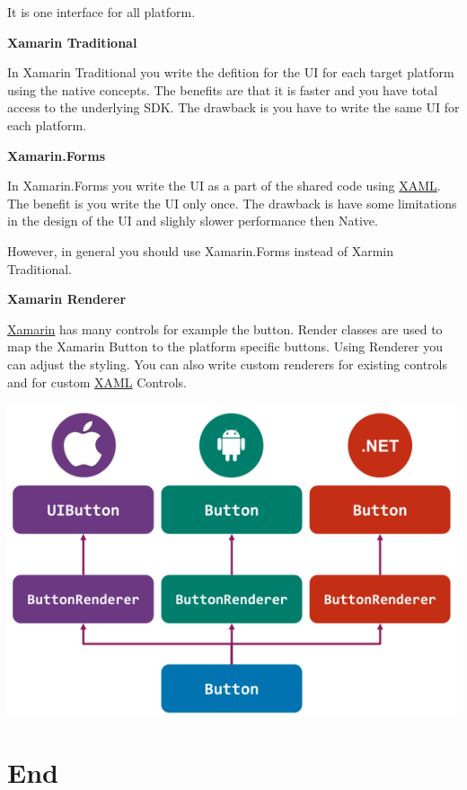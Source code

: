 \documentclass[10pt,twoside,landscape]{article}
\begin{document}
\begin{multicols}{3}
It is one interface for all platform.

\textbf{Xamarin Traditional}

In Xamarin Traditional you write the defition for the UI for each target platform using the native concepts.
The benefits are that it is faster and you have total access to the underlying SDK.
The drawback is you have to write the same UI for each platform.

\textbf{Xamarin.Forms}

In Xamarin.Forms you write the UI as a part of the shared code using \href{../../../roam/20211123162058-xaml.org}{XAML}.
The benefit is you write the UI only once.
The drawback is have some limitations in the design of the UI and slighly slower performance then Native.

However, in general you should use Xamarin.Forms instead of Xarmin Traditional.

\textbf{Xamarin Renderer}

\href{../../../roam/20220103094320-xamarin.org}{Xamarin} has many controls for example the button.
Render classes are used to map the Xamarin Button to the platform specific buttons.
Using Renderer you can adjust the styling.
You can also write custom renderers for existing controls and for custom \href{../../../roam/20211123162058-xaml.org}{XAML} Controls.


\begin{center}
\includegraphics[width=.9\linewidth]{img/xamarin_renderer.png}
\end{center}

\section{End}
\label{sec:orgf5b1246}
\end{multicols}
\end{document}
